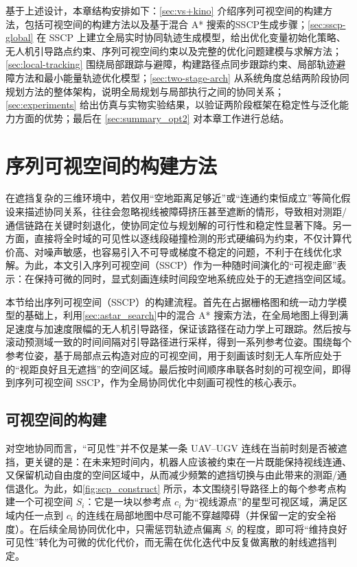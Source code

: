 基于上述设计，本章结构安排如下：\autoref{sec:vs+kino} 介绍序列可视空间的构建方法，包括可视空间的构建方法以及基于混合 A* 搜索的SSCP生成步骤；\autoref{sec:sscp-global} 在 SSCP 上建立全局实时协同轨迹生成模型，给出优化变量初始化策略、无人机引导路点约束、序列可视空间约束以及完整的优化问题建模与求解方法；\autoref{sec:local-tracking} 围绕局部跟踪与避障，构建路径点同步跟踪约束、局部轨迹避障方法和最小能量轨迹优化模型；\autoref{sec:two-stage-arch} 从系统角度总结两阶段协同规划方法的整体架构，说明全局规划与局部执行之间的协同关系；\autoref{sec:experiments} 给出仿真与实物实验结果，以验证两阶段框架在稳定性与泛化能力方面的优势；最后在 \autoref{sec:summary_opt2} 对本章工作进行总结。

\section{序列可视空间的构建方法}\label{sec:vs+kino}

在遮挡复杂的三维环境中，若仅用“空地距离足够近”或“连通约束恒成立”等简化假设来描述协同关系，往往会忽略视线被障碍挤压甚至遮断的情形，导致相对测距/通信链路在关键时刻退化，使协同定位与规划解的可行性和稳定性显著下降。另一方面，直接将全时域的可见性以逐线段碰撞检测的形式硬编码为约束，不仅计算代价高、对噪声敏感，也容易引入不可导或梯度不稳定的问题，不利于在线优化求解。为此，本文引入序列可视空间（SSCP）作为一种随时间演化的“可视走廊”表示：在保持可微的同时，显式刻画连续时间段空地系统应处于的无遮挡空间区域。

本节给出序列可视空间（SSCP）的构建流程。首先在占据栅格图和统一动力学模型的基础上，利用\autoref{sec:astar_search}中的混合 A* 搜索方法，在全局地图上得到满足速度与加速度限幅的无人机引导路径，保证该路径在动力学上可跟踪。然后按与滚动预测域一致的时间间隔对引导路径进行采样，得到一系列参考位姿。围绕每个参考位姿，基于局部点云构造对应的可视空间，用于刻画该时刻无人车所应处于的“视距良好且无遮挡”的空间区域。最后按时间顺序串联各时刻的可视空间，即得到序列可视空间 $\mathrm{SSCP}$，作为全局协同优化中刻画可视性的核心表示。

\subsection{可视空间的构建}\label{subsec:scp_construct}

对空地协同而言，“可见性”并不仅是某一条 UAV--UGV 连线在当前时刻是否被遮挡，更关键的是：在未来短时间内，机器人应该被约束在一片既能保持视线连通、又保留机动自由度的空间区域中，从而减少频繁的遮挡切换与由此带来的测距/通信退化。为此，如\autoref{fig:scp_construct} 所示，本文围绕引导路径上的每个参考点构建一个可视空间 \(S_i\)：它是一块以参考点 \(c_i\) 为“视线源点”的星型可视区域，满足区域内任一点到 \(c_i\) 的连线在局部地图中尽可能不穿越障碍（并保留一定的安全裕度）。在后续全局协同优化中，只需惩罚轨迹点偏离 \(S_i\) 的程度，即可将“维持良好可见性”转化为可微的优化代价，而无需在优化迭代中反复做离散的射线遮挡判定。

